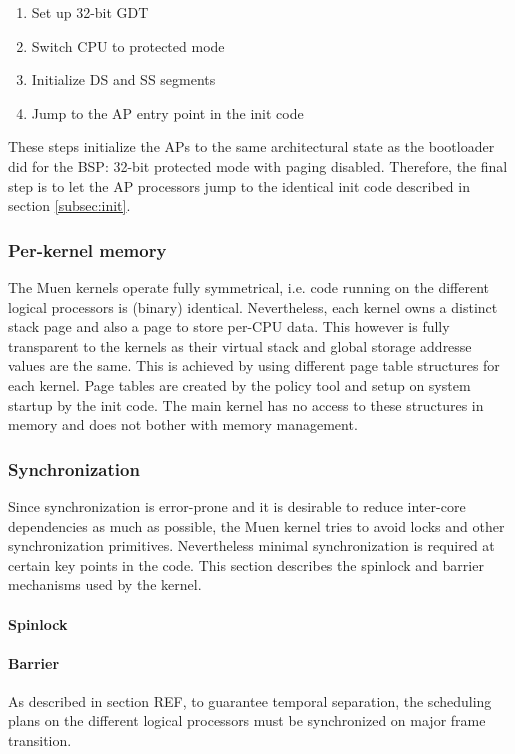 \begin{enumerate}
	\item Set up 32-bit GDT
	\item Switch CPU to protected mode
	\item Initialize DS and SS segments
	\item Jump to the AP entry point in the init code
\end{enumerate}

These steps initialize the APs to the same architectural state as the
bootloader did for the BSP: 32-bit protected mode with paging disabled.
Therefore, the final step is to let the AP processors jump to the identical
init code described in section \ref{subsec:init}.

\subsubsection{Per-kernel memory}
The Muen kernels operate fully symmetrical, i.e. code running on the different
logical processors is (binary) identical. Nevertheless, each kernel owns a
distinct stack page and also a page to store per-CPU data. This however is fully
transparent to the kernels as their virtual stack and global storage addresse
values are the same. This is achieved by using different page table structures
for each kernel. Page tables are created by the policy tool and setup on system
startup by the init code. The main kernel has no access to these structures in
memory and does not bother with memory management.

\subsubsection{Synchronization} Since synchronization is error-prone and it is
desirable to reduce inter-core dependencies as much as possible, the Muen
kernel tries to avoid locks and other synchronization primitives. Nevertheless
minimal synchronization is required at certain key points in the code. This
section describes the spinlock and barrier mechanisms used by the kernel.

\paragraph{Spinlock}
\paragraph{Barrier}
As described in section REF, to guarantee temporal separation, the scheduling
plans on the different logical processors must be synchronized on major frame
transition.

